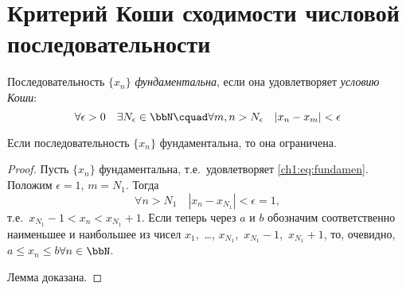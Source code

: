\section{Критерий Коши сходимости числовой последовательности}

\begin{defn}
Последовательность $\{x_n\}$ \textit{фундаментальна}, если она удовлетворяет \textit{условию Коши}:
\begin{equation}
\label{ch1:eq:fundamen}
\forall \epsilon >0 \quad \exists N_{\epsilon} \in \bbN\cquad \forall m,n > N_{\epsilon}\quad |x_n-x_m|<\epsilon  
\end{equation}
\end{defn}

\begin{lemm}
\label{ch1:lm:fundamendal}
Если последовательность $\{x_n\}$ фундаментальна, то она ограничена.
\end{lemm}
\begin{proof}
Пусть $\{x_n\}$ фундаментальна, т.е.~удовлетворяет \eqref{ch1:eq:fundamen}. Положим $\epsilon = 1$, $m = N_1$. Тогда $$
\forall n > N_1\quad |x_n-x_{N_1}| <\epsilon = 1,
$$ 
т.е.~$x_{N_1} - 1< x_n < x_{N_1}+1$. Если теперь через $a$ и $b$ обозначим соответственно наименьшее и наибольшее из чисел $x_1$,~\dots, $x_{N_1}$,~$x_{N_1}-1$,~$x_{N_1}+1$, то, очевидно, $a \le x_n \le b$\quad$\forall n \in \bbN$.

Лемма доказана.
\end{proof}


